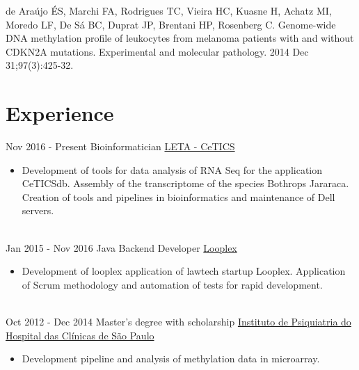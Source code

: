 \documentclass[letterpaper]{twentysecondcv} %
\begin{document}
de Araújo ÉS, Marchi FA, Rodrigues TC, Vieira HC, Kuasne H, Achatz MI, Moredo LF, De Sá BC, Duprat JP, Brentani HP, Rosenberg C. Genome-wide DNA methylation profile of leukocytes from melanoma patients with and without CDKN2A mutations. Experimental and molecular pathology. 2014 Dec 31;97(3):425-32. \vspace{2mm}


\section{Experience}

\begin{twenty} %
\twentyitem
    	{Nov 2016 - }
		{Present}
        {Bioinformatician}
        {\href{http://cetics.butantan.gov.br/}{LETA - CeTICS}}
        {}
        {\begin{itemize}
        \item Development of tools for data analysis of RNA Seq for the application CeTICSdb. Assembly of the transcriptome of the species Bothrops Jararaca. Creation of tools and pipelines in bioinformatics and maintenance of Dell servers.
        \end{itemize}}
        \\
	\twentyitem
    	{Jan 2015 - }
		{Nov 2016}
        {Java Backend Developer }
        {\href{www.looplex.com.br/}{Looplex}}
        {}
        {
        {\begin{itemize}
        \item Development of looplex application of lawtech startup Looplex. Application of Scrum methodology and automation of tests for rapid development. 
    \end{itemize}}
        }
    \\   
    \twentyitem
   		{Oct 2012 - }
		{Dec 2014}
        {Master's degree with scholarship}
        {\href{www.ipqhc.org.br}{Instituto de Psiquiatria do Hospital das Clínicas de São Paulo}}
        {}
        {
        {\begin{itemize}
        \item Development pipeline and analysis of methylation data in microarray.
    \end{itemize}}
        }       
\end{twenty}
\end{document}
